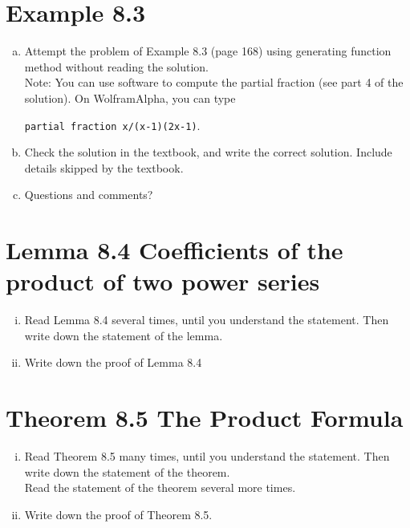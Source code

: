 \documentclass[10pt]{amsart}
\begin{document}
\section{Example 8.3}
\begin{enumerate}[a.]
	\item 
	Attempt the problem of Example 8.3 (page 168) using generating function method without reading the solution. \\
	
	Note:
	You can use software to compute the partial fraction (see part 4 of the solution). On WolframAlpha, you can type 
	\begin{center}
		\texttt{partial fraction x/(x-1)(2x-1)}.
	\end{center}
	
	\item 
	Check the solution in the textbook, and write the correct solution. Include  details skipped by the textbook.
	
	\item Questions and comments?
\end{enumerate}




\section{Lemma 8.4 Coefficients of the product of two power series}

\begin{enumerate}[i.]
\item Read Lemma 8.4 several times, until you understand the statement. Then write down the statement of the lemma.

\item 
Write down the proof of Lemma 8.4
\end{enumerate}








\section{Theorem 8.5 The Product Formula}

\begin{enumerate}[i.]
	\item Read Theorem 8.5 many times, until you understand the statement. Then write down the statement of the theorem.\\
	
	Read the statement of the theorem  several more times.
	
	
	\item 
	Write down the proof of Theorem 8.5.
\end{enumerate}
\end{document}
